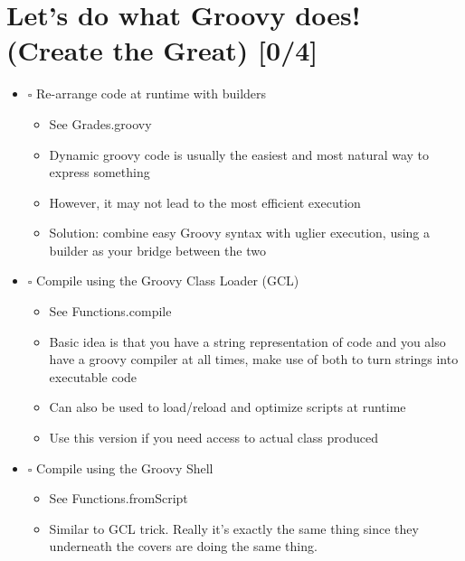 \documentclass[11pt]{article}
\begin{document}
\section{Let's do what Groovy does! (Create the Great) [0/4]}
\label{sec:orgheadline8}

\begin{itemize}
\item $\square$ Re-arrange code at runtime with builders

\begin{itemize}
\item See Grades.groovy

\item Dynamic groovy code is usually the easiest and most natural way to express something

\item However, it may not lead to the most efficient execution

\item Solution: combine easy Groovy syntax with uglier execution, using a builder as your bridge between the two
\end{itemize}

\item $\square$ Compile using the Groovy Class Loader (GCL)

\begin{itemize}
\item See Functions.compile

\item Basic idea is that you have a string representation of code and you also have a groovy compiler at all times, make use of both to turn strings into executable code

\item Can also be used to load/reload and optimize scripts at runtime

\item Use this version if you need access to actual class produced
\end{itemize}

\item $\square$ Compile using the Groovy Shell

\begin{itemize}
\item See Functions.fromScript

\item Similar to GCL trick. Really it's exactly the same thing since they underneath the covers are doing the same thing.


\end{itemize}
\end{itemize}
\end{document}
